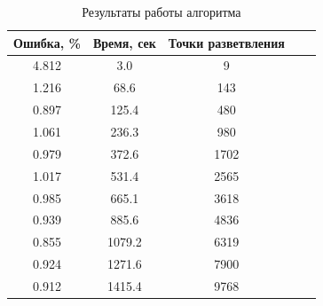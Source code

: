\begin{table}[H]
	\centering
	\caption{Результаты работы алгоритма}
	\label{tabular:steiner_res_1}
	\begin{tabular}{|c|c|c|c|c|}
		\hline
		\textbf{Ошибка, \%} & \textbf{Время, сек} & \textbf{Точки разветвления} \\ \hline
		4.812 &	3.0 & 9 \\ \hline
		1.216 &	68.6 &	143 \\ \hline
		0.897 &	125.4 &	480 \\ \hline
		1.061 &	236.3 &	980 \\ \hline
		0.979 &	372.6 &	1702 \\ \hline
		1.017 &	531.4 &	2565 \\ \hline
		0.985 &	665.1 &	3618 \\ \hline
		0.939 &	885.6 &	4836 \\ \hline
		0.855 &	1079.2 & 6319 \\ \hline
		0.924 &	1271.6 & 7900 \\ \hline
		0.912 &	1415.4 & 9768 \\ \hline
	\end{tabular}
\end{table}
\vspace{4mm}

